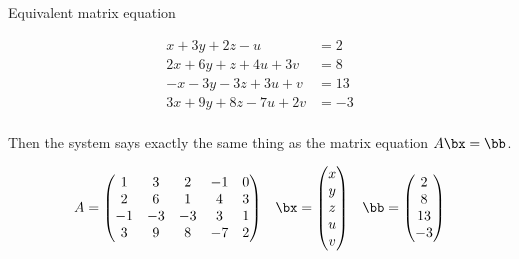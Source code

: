 \documentclass[handout]{beamer}
\begin{document}
\begin{frame}{Equivalent matrix equation}

\begin{align*}
 x + 3y + 2z - u  \qquad &= 2 \\
2x + 6y + z + 4u + 3v  &= 8 \\
-x -3y  -3z + 3u + v  &= 13 \\
3x + 9y + 8z  -7u + 2v  &= -3 \\
\end{align*}

Then the system says exactly the same thing as the matrix equation $A \bx = \bb$.

$$
\begin{matrix}
A =
\begin{pmatrix}
1 & 3 & 2 & -1 & 0 \\
2 & 6 & 1 & 4 & 3\\
-1 & -3 & -3 & 3 & 1 \\
3 & 9 & 8 & -7 & 2
\end{pmatrix}
&
\bx =
\begin{pmatrix}
x \\ y \\ z \\ u \\ v
\end{pmatrix}
&
\bb =
\begin{pmatrix}
2 \\ 8 \\ 13 \\ -3
\end{pmatrix}
\end{matrix}
$$

\end{frame}

\end{document}
